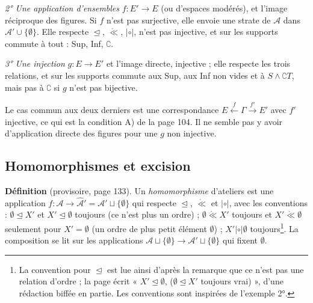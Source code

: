 \documentclass[11pt,a4paper]{article}
\begin{document}
\emph{2° Une application d'ensembles} $f : E' \to E$ (ou d'espaces modérés), et
l'image réciproque des figures. Si $f$ n'est pas surjective, elle envoie une
strate de $\mathcal{A}$ dans $\mathcal{A}' \cup \{\emptyset\}$. Elle respecte
$\trianglelefteq$, $\mathrel{\mathring{\ll}}$, $\mathrel{|\circ|}$, n'est pas
injective, et sur les supports commute à tout : Sup, Inf, $\complement$.

\emph{3° Une injection} $g : E \to E'$ et l'image directe, injective ; elle
respecte les trois relations, et sur les supports commute aux Sup, aux Inf non
vides et à $S \wedge \complement T$, mais pas à $\complement$ si $g$ n'est pas
bijective.

Le cas commun aux deux derniers est une correspondance $E \xleftarrow{f} \Gamma
\xrightarrow{f'} E'$ avec $f'$ injective, ce qui est la condition A) de la
page 104. Il ne semble pas y avoir d'application directe des figures pour une $g$
non injective.

\subsection*{Homomorphismes et excision}

\textbf{Définition} (provisoire, page 133). Un \emph{homomorphisme} d'ateliers est
une application $f : \mathcal{A} \to \widehat{\mathcal{A}}' = \mathcal{A}' \sqcup
\{\emptyset\}$ qui respecte $\trianglelefteq$, $\mathrel{\mathring{\ll}}$ et
$\mathrel{|\circ|}$, avec les conventions : $\emptyset \trianglelefteq X'$ et $X'
\trianglelefteq \emptyset$ toujours (ce n'est plus un ordre) ; $\emptyset
\mathrel{\mathring{\ll}} X'$ toujours et $X' \mathrel{\mathring{\ll}} \emptyset$
seulement pour $X' = \emptyset$ (un ordre de plus petit élément $\emptyset$) ;
$X' \mathrel{|\circ|} \emptyset$ toujours\footnote{La convention pour
$\trianglelefteq$ est lue ainsi d'après la remarque que ce n'est pas une relation
d'ordre ; la page écrit « $X' \trianglelefteq \emptyset$, ($\emptyset
\trianglelefteq X'$ toujours vrai) », d'une rédaction biffée en partie. Les
conventions sont inspirées de l'exemple 2°.}. La composition se lit sur les
applications $\mathcal{A} \sqcup \{\emptyset\} \to \mathcal{A}' \sqcup
\{\emptyset\}$ qui fixent $\emptyset$.
\end{document}

